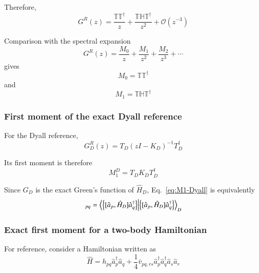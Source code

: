 \documentclass[aip,jcp,reprint,noshowkeys,superscriptaddress]{revtex4-1}
\begin{document}
Therefore,
\begin{equation}
  G^R(z)
  =
  \frac{
    \mathbb T\mathbb T^\dagger
  }{z}
  +
  \frac{
    \mathbb T\mathbb H\mathbb T^\dagger
  }{z^2}
  +
  \mathcal O(z^{-3})
  \label{eq:G-high-frequency}
\end{equation}

Comparison with the spectral expansion
\begin{equation}
  G^R(z)
  =
  \frac{M_0}{z}
  +
  \frac{M_1}{z^2}
  +
  \frac{M_2}{z^3}
  +
  \cdots
\end{equation}
gives
\begin{equation}
  M_0
  =
  \mathbb T\mathbb T^\dagger
\end{equation}
and
\begin{equation}
  M_1
  =
  \mathbb T
  \mathbb H
  \mathbb T^\dagger
  \label{eq:M1-Hermitian}
\end{equation}


\subsubsection{First moment of the exact Dyall reference}

For the Dyall reference,
\begin{equation}
  G_D^R(z)
  =
  T_D
  \left(
    zI-K_D
  \right)^{-1}
  T_D^\dagger
\end{equation}

Its first moment is therefore
\begin{equation}
  M_1^D
  =
  T_DK_DT_D^\dagger
  \label{eq:M1-Dyall}
\end{equation}

Since $G_D$ is the exact Green's function of $\hat H_D$,
Eq.~\eqref{eq:M1-Dyall} is equivalently
\begin{equation}
  [M_1^D]_{pq}
  =
  \braket{
    \left\{
      [\hat a_p,\hat H_D]
      \hat a_q^\dagger
    \right\}
  }_D
  \label{eq:M1-Dyall-commutator}
\end{equation}


\subsubsection{Exact first moment for a two-body Hamiltonian}

For reference, consider a Hamiltonian written as
\begin{equation}
  \hat H
  =
  h_{pq}
  \hat a_p^\dagger\hat a_q
  +
  \frac14
  \bar v_{pq,rs}
  \hat a_p^\dagger
  \hat a_q^\dagger
  \hat a_s
  \hat a_r
  \label{eq:H-two-body-moment}
\end{equation}
\end{document}
